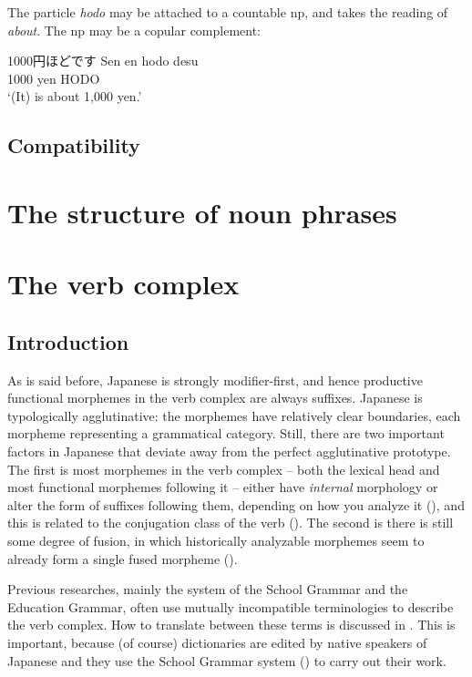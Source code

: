 \documentclass[UTF8, a4paper, oneside, scheme=plain]{ctexrep}
\newcommand{\corpus}[1]{\emph{#1}}
\newcommand{\translate}[1]{`#1'}
\begin{document}
The particle \corpus{hodo} may be attached to a countable \ac{np},
and takes the reading of \corpus{about}.
The \ac{np} may be a copular complement:
\begin{exe}
    \ex 1000円ほどです 
    \gll Sen en hodo desu \\
    1000 yen HODO  \\
    \glt \translate{(It) is about 1,000 yen.}
\end{exe}

\section{Compatibility}\label{sec:particle-compatible}



\chapter{The structure of noun phrases}

\chapter{The verb complex}\label{chap:verb-complex}

\section{Introduction}

As is said before, Japanese is strongly modifier-first,
and hence productive functional morphemes in the verb complex are always suffixes.
Japanese is typologically agglutinative:
the morphemes have relatively clear boundaries,
each morpheme representing a grammatical category.
Still, there are two important factors in Japanese that deviate away 
from the perfect agglutinative prototype.
The first is most morphemes in the verb complex 
-- both the lexical head and most functional morphemes following it --
either have \emph{internal} morphology or alter the form of suffixes following them,
depending on how you analyze it (),
and this is related to the conjugation class of the verb ().
The second is there is still some degree of fusion, 
in which historically analyzable morphemes seem to already form a single fused morpheme 
().

Previous researches, mainly the system of the School Grammar and the Education Grammar,
often use mutually incompatible terminologies to describe the verb complex.
How to translate between these terms is discussed in .
This is important,
because (of course) dictionaries are edited by native speakers of Japanese
and they use the School Grammar system () to carry out their work.
\end{document}
